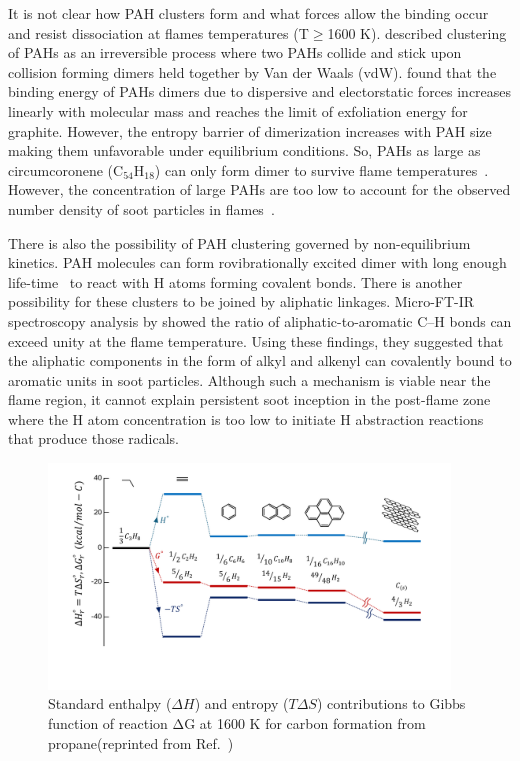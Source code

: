 It is not clear how PAH clusters form and what forces allow the binding occur and resist dissociation at flames temperatures (T$\ge$1600 K). \citet{frenklach2002reaction} described clustering of PAHs as an irreversible process where two PAHs collide and stick upon collision forming dimers held together by Van der Waals (vdW). \citet{herdman2008intermolecular} found that the binding energy of PAHs dimers due to dispersive and electorstatic forces increases linearly with molecular mass and reaches the limit of exfoliation energy for graphite. However, the entropy barrier of dimerization increases with PAH size making them unfavorable under equilibrium conditions. So, PAHs as large as circumcoronene ($\mathrm{C_{54}H_{18}}$) can only form dimer to survive flame temperatures~\citep{Wang2011}. However, the concentration of large PAHs are too low to account for the observed number density of soot particles in flames~\citep{totton2012quantitative}. 

There is also the possibility of PAH clustering governed by non-equilibrium kinetics. PAH molecules can form rovibrationally excited dimer with long enough life-time~\cite{wong2009molecular} to react with H atoms forming covalent bonds. There is another possibility for these clusters to be joined by aliphatic linkages. Micro-FT-IR spectroscopy analysis by \citet{cain2011evidence} showed the ratio of aliphatic-to-aromatic C–H bonds can exceed unity at the flame temperature. Using these findings, they suggested that
the aliphatic components in the form of alkyl and
alkenyl can covalently bound to aromatic units in soot particles. Although such a mechanism is viable near the flame region, it cannot explain persistent soot inception in the post-flame zone~\citep{zhao2005particle} where the H atom concentration is too low to initiate H abstraction reactions that produce those radicals.

\begin{figure}[!htbp]
	\centering
	\includegraphics[height=60mm, ]{Figures/Introduction/gibbs_propane.pdf}
	\caption{Standard enthalpy (${\Delta H}$) and entropy (${T\Delta S}$) contributions to Gibbs function of reaction $\mathrm{\Delta G}$ at 1600 K for carbon formation from propane(reprinted from Ref.~\citep{Wang2011})}
\end{figure} 

